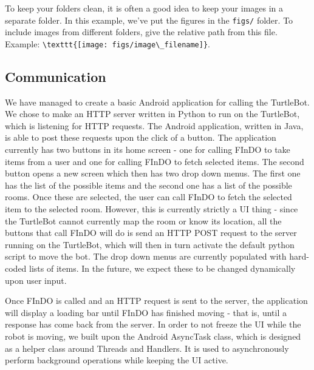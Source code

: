 \documentclass{article}
\begin{document}
To keep your folders clean, it is often a good idea to keep your images in a separate folder. In this example, we've put the figures in the \texttt{figs/} folder. To include images from different folders, give the relative path from this file. Example: \verb+\texttt{[image: figs/image\_filename]}+.


\subsection{Communication}

We have managed to create a basic Android application for calling the TurtleBot. We chose to make an HTTP server written in Python to run on the TurtleBot, which is listening for HTTP requests. The Android application, written in Java, is able to post these requests upon the click of a button.
The application currently has two buttons in its home screen - one for calling FInDO to take items from a user and one for calling FInDO to fetch selected items. The second button opens a new screen which then has two drop down menus. The first one has the list of the possible items and the second one has a list of the possible rooms. Once these are selected, the user can call FInDO to fetch the selected item to the selected room. However, this is currently strictly a UI thing - since the TurtleBot cannot currently map the room or know its location, all the buttons that call FInDO will do is send an HTTP POST request to the server running on the TurtleBot, which will then in turn activate the default python script to move the bot. 
The drop down menus are currently populated with hard-coded lists of items. In the future, we expect these to be changed dynamically upon user input.

Once FInDO is called and an HTTP request is sent to the server, the application will display a loading bar until FInDO has finished moving - that is, until a response has come back from the server. In order to not freeze the UI while the robot is moving, we built upon the Android AsyncTask class, which is designed as a helper class around Threads and Handlers. It is used to asynchronously perform background operations while keeping the UI active.
\end{document}
